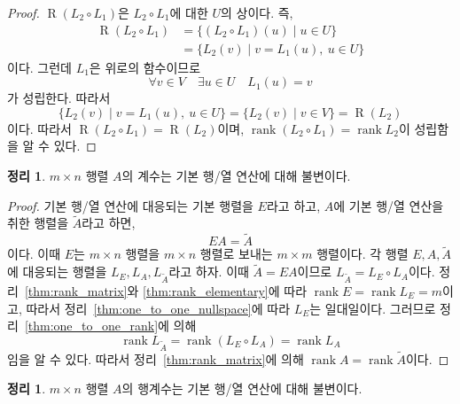 \documentclass[unfonts,oneside,a4paper]{oblivoir}
\theoremstyle{definition}
\theoremstyle{theorem}
\newtheorem{theorem}[definition]{정리}
\theoremstyle{theorem}
\theoremstyle{remark}
\theoremstyle{remark}
\theoremstyle{remark}
\theoremstyle{remark}
\renewcommand{\vec}[1]{\bm{\mathit{#1}}}
\DeclareMathOperator{\Range}{R}
\DeclareMathOperator{\rank}{rank}
\begin{document}
\begin{proof}
    $\Range(L_2 \circ L_1)$은 $L_2 \circ L_1$에 대한 $U$의 상이다.
    즉,
    \begin{align*}
        \Range(L_2 \circ L_1) &= \{(L_2 \circ L_1)(\vec u) \mid \vec u \in U\}\\
                        &= \{L_2(\vec v) \mid \vec v = L_1(\vec u),\ \vec u \in U\}
    \end{align*}
    이다.
    그런데 $L_1$은 위로의 함수이므로
    \begin{equation*}
        \forall \vec v \in V \quad \exists \vec u \in U \quad L_1(\vec u) = \vec v
    \end{equation*}
    가 성립한다.
    따라서
    \begin{equation*}
        \{L_2(\vec v) \mid \vec v = L_1(\vec u),\ \vec u \in U\} = \{L_2(\vec v) \mid \vec v \in V\} = \Range(L_2)
    \end{equation*}
    이다.
    따라서 $\Range(L_2 \circ L_1) = \Range(L_2)$이며, $\rank(L_2 \circ L_1) = \rank L_2$이 성립함을 알 수 있다.
\end{proof}

\begin{theorem} \label{thm:elementary_op_rank}
    $m \times n$ 행렬 $A$의 계수는 기본 행/열 연산에 대해 불변이다.
\end{theorem}

\begin{proof}
    기본 행/열 연산에 대응되는 기본 행렬을 $E$라고 하고, $A$에 기본 행/열 연산을 취한 행렬을 $\tilde A$라고 하면,
    \begin{equation*}
        EA = \tilde A
    \end{equation*}
    이다.
    이때 $E$는 $m \times n$ 행렬을 $m \times n$ 행렬로 보내는 $m \times m$ 행렬이다.
    각 행렬 $E, A, \tilde A$에 대응되는 행렬을 $L_E, L_A, L_{\tilde A}$라고 하자.
    이때 $\tilde A = EA$이므로 $L_{\tilde A} = L_E \circ L_A$이다.
    정리~\ref{thm:rank_matrix}와 \ref{thm:rank_elementary}에 따라 $\rank E = \rank L_E = m$이고, 따라서 정리~\ref{thm:one_to_one_nullspace}에 따라 $L_E$는 일대일이다.
    그러므로 정리~\ref{thm:one_to_one_rank}에 의해
    \begin{equation*}
        \rank L_{\tilde A} = \rank (L_E \circ L_A) = \rank L_A
    \end{equation*}
    임을 알 수 있다.
    따라서 정리~\ref{thm:rank_matrix}에 의해 $\rank A = \rank \tilde A$이다.
\end{proof}

\begin{theorem} \label{thm:rowrankinvar}
    $m \times n$ 행렬 $A$의 행계수는 기본 행/열 연산에 대해 불변이다.
\end{theorem}
\end{document}
